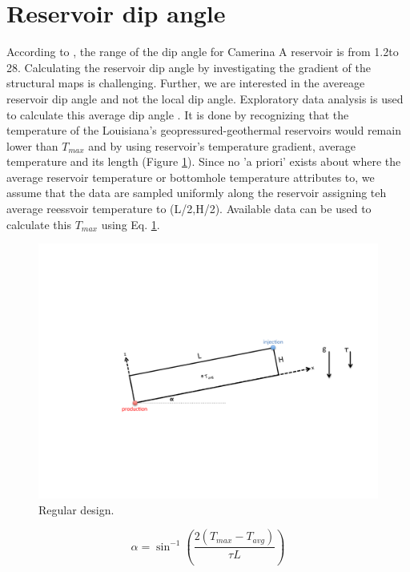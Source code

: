 \documentclass[review,authoryear, 12pt]{elsarticle}\usepackage[]{graphicx}\usepackage[]{color}
\begin{document}
\section{Reservoir dip angle}
According to \citet{Gray2010}, the range of the dip angle for Camerina A reservoir is from 1.2\degree to 28\degree. Calculating the reservoir dip angle by investigating the gradient of the structural maps is challenging. Further, we are interested in the avereage reservoir dip angle and not the local dip angle. Exploratory data analysis is used to calculate this average dip angle \citep{diggle2007model}. It is done by recognizing that the temperature of the Louisiana's geopressured-geothermal reservoirs would remain lower than $T_{max}$ and by using reservoir's temperature gradient, average temperature and its length (Figure \ref{Fig:Schematic}). Since no 'a priori' exists about where the average reservoir temperature or bottomhole temperature attributes to, we assume that the data are sampled uniformly along the reservoir assigning teh average reessvoir temperature to (L/2,H/2). Available data can be used to calculate this $T_{max}$ using Eq. \ref{Fig:Schematic}.


\begin{figure}
\centering
\includegraphics[width=0.75\linewidth]{./figure/schematic}
\caption{Regular design.} 
\label{Fig:Schematic}
\end{figure}



\begin{equation}
\label{Eq:DipModel}
\alpha = \sin^{-1} \left(\frac{2(T_{max}-T_{avg})}{\tau L}\right)
\end{equation}
\end{document}
